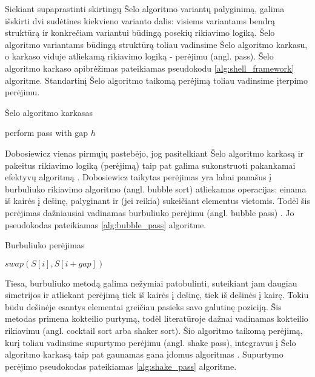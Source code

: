 \documentclass{VUMIFInfBakalaurinis}
\begin{document}
Siekiant supaprastinti skirtingų Šelo algoritmo variantų palyginimą, galima išskirti dvi sudėtines kiekvieno varianto dalis:
visiems variantams bendrą struktūrą ir konkrečiam variantui būdingą posekių rikiavimo logiką.
Šelo algoritmo variantams būdingą struktūrą toliau vadinsime Šelo algoritmo karkasu,
o karkaso viduje atliekamą rikiavimo logiką - perėjimu (angl. pass).
Šelo algoritmo karkaso apibrėžimas pateikiamas pseudokodu \ref{alg:shell_framework} algoritme.
Standartinį Šelo algoritmo taikomą perėjimą toliau vadinsime įterpimo perėjimu.

\begin{algorithm}[H]
  \caption{Šelo algoritmo karkasas}\label{alg:shell_framework}
  \begin{algorithmic}[1]
        \State perform pass with gap $h$
    \EndFor
  \end{algorithmic}
\end{algorithm}

Dobosiewicz vienas pirmųjų pastebėjo, jog pasitelkiant
Šelo algoritmo karkasą ir pakeitus rikiavimo logiką (perėjimą) taip pat galima sukonstruoti pakankamai
efektyvų algoritmą \cite{dobosiewicz1980efficient}.
Dobosiewicz taikytas perėjimas yra labai panašus į burbuliuko rikiavimo algoritmo (angl. bubble sort) atliekamas operacijas:
einama iš kairės į dešinę, palyginant ir (jei reikia) sukeičiant elementus vietomis.
Todėl šis perėjimas dažniausiai vadinamas burbuliuko perėjimu (angl. bubble pass) \cite{sedgewick1996analysis}.
Jo pseudokodas pateikiamas \ref{alg:bubble_pass} algoritme.

\begin{algorithm}[H]
  \caption{Burbuliuko perėjimas}\label{alg:bubble_pass}
  \begin{algorithmic}[1]
        \State $swap(S[i], S[i+gap])$
      \EndIf
    \EndFor
  \end{algorithmic}
\end{algorithm}

Tiesa, burbuliuko metodą galima nežymiai patobulinti, suteikiant jam daugiau simetrijos ir atliekant perėjimą
tiek iš kairės į dešinę, tiek iš dešinės į kairę.
Tokiu būdu dešinėje esantys elementai greičiau pasieks savo galutinę poziciją.
Šis metodas primena kokteilio purtymą, todėl literatūroje dažnai vadinamas kokteilio rikiavimu (angl. cocktail sort arba shaker sort).
Šio algoritmo taikomą perėjimą, kurį toliau vadinsime supurtymo perėjimu (angl. shake pass), integravus į Šelo algoritmo karkasą
taip pat gaunamas gana įdomus algoritmas \cite{incerpi1986practical}.
Supurtymo perėjimo pseudokodas pateikiamas \ref{alg:shake_pass} algoritme.
\end{document}
